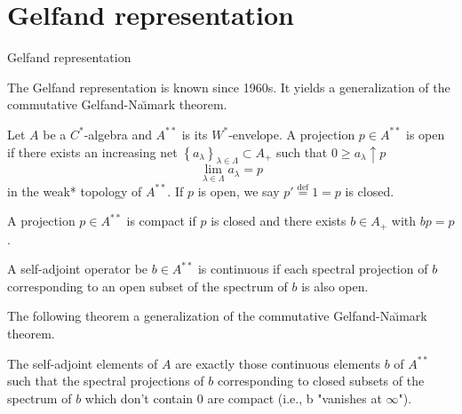 \documentclass{beamer}
\theoremstyle{plain}
\newcommand{\la}{\lambda}
\newcommand{\La}{\Lambda}
\newcommand{\bydef}{\stackrel{\mathrm{def}}{=}}
\begin{document}
\section{Gelfand representation}
\begin{frame}
		{\Large Gelfand representation}
	
The \alert{Gelfand representation} is known since 1960s. It yields a generalization of the commutative Gelfand-Na\u{\i}mark theorem.
\begin{definition}\label{open_close_ideal_defn}
Let $A$ be a $C^*$-algebra and $A^{**}$ is its $W^*$-envelope.	A projection $p \in A^{**}$  is \alert{ open} if there exists an increasing 
	net $\left\{a_\la \right\}_{\la \in \La}\subset A_+$ such that $0\ge a_\la \uparrow p$
	$$
	\lim_{\la\in \La} a_\la = p
	$$
	in the weak* topology of $A^{**}$. If $p$ is open, we say $p' \bydef 1=p$ is \alert{closed}.
\end{definition}
\begin{definition}\label{compact_p_defn}
	A projection $p\in A^{**}$ is \alert{ compact} if $p$ is {closed}
	and there exists $b \in A_+$ with $bp = p$.
\end{definition}

\end{frame}
\begin{frame}
\begin{definition}\label{coninuous_p_defn}
	A self-adjoint operator be $b\in A^{**}$ is \alert{continuous}
	if each spectral projection of $b$ corresponding to an open subset of
	the spectrum of  $b$ is also open.
\end{definition}
The following theorem a generalization of the commutative Gelfand-Na\u{\i}mark theorem.
\begin{theorem}\label{coninuous_p_thm}
	The self-adjoint elements of $A$ are exactly those
	continuous elements $b$ of $A^{**}$ such that the spectral projections of $b$
	corresponding to closed subsets of the spectrum of $b$ which don't contain
	$0$ are compact (i.e., b "vanishes at $\infty$").
\end{theorem}

\end{frame}
\end{document}
